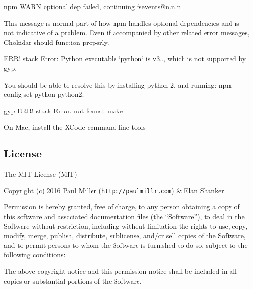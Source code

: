 \begin{DoxyItemize}
\item {\ttfamily npm W\+A\+RN optional dep failed, continuing fsevents@n.\+n.\+n}
\begin{DoxyItemize}
\item This message is normal part of how {\ttfamily npm} handles optional dependencies and is not indicative of a problem. Even if accompanied by other related error messages, Chokidar should function properly.
\end{DoxyItemize}
\item {\ttfamily E\+R\+R! stack Error\+: Python executable \char`\"{}python\char`\"{} is v3.., which is not supported by gyp.}
\begin{DoxyItemize}
\item You should be able to resolve this by installing python 2. and running\+: {\ttfamily npm config set python python2.}
\end{DoxyItemize}
\item {\ttfamily gyp E\+R\+R! stack Error\+: not found\+: make}
\begin{DoxyItemize}
\item On Mac, install the X\+Code command-\/line tools
\end{DoxyItemize}
\end{DoxyItemize}

\subsection*{License}

The M\+IT License (M\+IT)

Copyright (c) 2016 Paul Miller (\href{http://paulmillr.com}{\tt http\+://paulmillr.\+com}) \& Elan Shanker

Permission is hereby granted, free of charge, to any person obtaining a copy of this software and associated documentation files (the “\+Software”), to deal in the Software without restriction, including without limitation the rights to use, copy, modify, merge, publish, distribute, sublicense, and/or sell copies of the Software, and to permit persons to whom the Software is furnished to do so, subject to the following conditions\+:

The above copyright notice and this permission notice shall be included in all copies or substantial portions of the Software.

